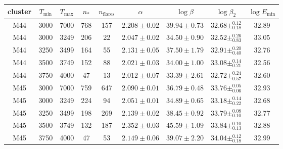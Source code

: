 \begin{tabular}{ccccccccc}
\toprule
   cluster &  $T_\mathrm{min}$ &  $T_\mathrm{max}$ &      $n_*$ &  $n_\mathrm{flares}$ &        $\alpha$ &     $\log\beta$ &             $\log\beta_2$ & $\log E_\mathrm{min}$ \\
\midrule
       M44 &              3000 &              7000 &        768 &                  157 &  $2.208\pm0.02$ &  $39.94\pm0.73$ &  $32.68\pm^{0.12}_{0.18}$ &                 32.89 \\
       M44 &              3000 &              3249 &        206 &                   22 &  $2.047\pm0.02$ &  $34.50\pm0.90$ &  $32.52\pm^{0.26}_{0.83}$ &                 33.05 \\
       M44 &              3250 &              3499 &        164 &                   55 &  $2.131\pm0.05$ &  $37.50\pm1.79$ &  $32.91\pm^{0.20}_{0.40}$ &                 32.76 \\
       M44 &              3500 &              3749 &        152 &                   88 &  $2.021\pm0.03$ &  $34.00\pm1.00$ &  $33.08\pm^{0.14}_{0.21}$ &                 32.56 \\
       M44 &              3750 &              4000 &         47 &                   13 &  $2.012\pm0.07$ &  $33.39\pm2.61$ &  $32.72\pm^{0.24}_{0.57}$ &                 32.60 \\
       M45 &              3000 &              7000 &        759 &                  647 &  $2.090\pm0.01$ &  $36.79\pm0.48$ &  $33.76\pm^{0.05}_{0.06}$ &                 32.93 \\
       M45 &              3000 &              3249 &        224 &                   94 &  $2.051\pm0.01$ &  $34.89\pm0.65$ &  $33.18\pm^{0.14}_{0.22}$ &                 32.68 \\
       M45 &              3250 &              3499 &        198 &                  269 &  $2.139\pm0.02$ &  $38.45\pm0.92$ &  $33.79\pm^{0.08}_{0.10}$ &                 32.77 \\
       M45 &              3500 &              3749 &        132 &                  187 &  $2.352\pm0.03$ &  $45.59\pm1.09$ &  $33.84\pm^{0.10}_{0.13}$ &                 32.88 \\
       M45 &              3750 &              4000 &         47 &                   53 &  $2.149\pm0.06$ &  $39.07\pm2.20$ &  $34.04\pm^{0.12}_{0.18}$ &                 32.99 \\
\bottomrule
\end{tabular}
